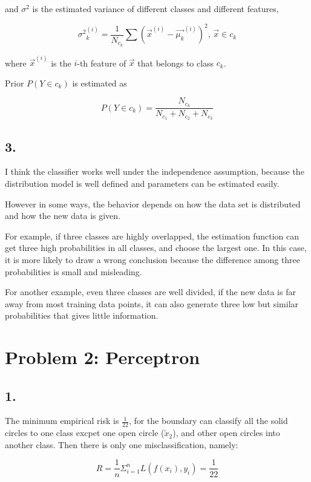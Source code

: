 \documentclass[]{article}
\begin{document}
and \(\sigma^2\) is the estimated variance of different classes and
different features,

\[{\sigma^2}_k^{(i)} = \frac{1}{N_{c_k}}\sum(\vec{x}^{(i)} - \vec{\mu_k}^{(i)})^2,\,{\vec{x}}\in c_k\]

where \(\vec{x}^{(i)}\) is the \(i\)-th feature of \(\vec{x}\) that
belongs to class \(c_k\).

Prior \(P(Y \in c_k)\) is estimated as

\[P(Y \in c_k) = \frac{N_{c_k}}{N_{c_1} + N_{c_2} + N_{c_3}}\]

\subsection{3.}\label{section-2}

I think the classifier works well under the independence assumption,
because the distribution model is well defined and parameters can be
estimated easily.

However in some ways, the behavior depends on how the data set is
distributed and how the new data is given.

For example, if three classes are highly overlapped, the estimation
function can get three high probabilities in all classes, and choose the
largest one. In this case, it is more likely to draw a wrong conclusion
because the difference among three probabilities is small and
misleading.

For another example, even three classes are well divided, if the new
data is far away from most training data points, it can also generate
three low but similar probabilities that gives little information.

\section{Problem 2: Perceptron}\label{problem-2-perceptron}

\subsection{1.}\label{section-3}

The minimum empirical risk is \(\frac{1}{22}\), for the boundary can
classify all the solid circles to one class excpet one open circle
(\(\tilde{x}_2\)), and other open circles into another class. Then there
is only one misclassification, namely:

\[R = \frac{1}{n}\Sigma_{i = 1}^nL(f(x_i), y_i) = \frac{1}{22}\]
\end{document}
